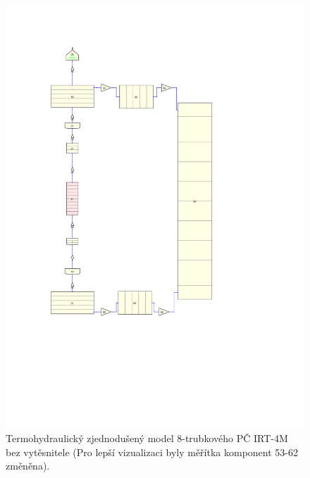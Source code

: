 \begin{figure}[H]
	\centering
	\includegraphics[width=\textwidth, trim={4cm 15cm 12cm 6cm}, clip]{./07_prilohy/prehled_modelu/t8bj.pdf}
	\caption{Termohydraulický zjednodušený model 8-trubkového PČ IRT-4M bez vytěsnitele (Pro lepší vizualizaci byly měřítka komponent 53-62 změněna).}
	\label{fig:irt_nat_conv_jedno}
\end{figure}

